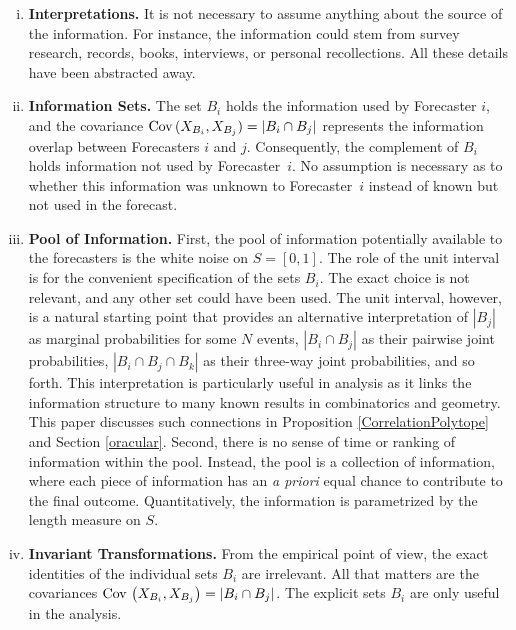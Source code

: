 \documentclass[12pt]{article}
\theoremstyle{definition}
\theoremstyle{definition}
\def\Cov{{\rm Cov}\,}
\begin{document}
\begin{enumerate}[(i)]
\item {\bf Interpretations.} It is not necessary to assume anything 
about the source of the information.  For instance, the information 
could stem from survey research, records, books, 
interviews, or personal recollections.  All these details have 
been abstracted away.

\item {\bf Information Sets.} The set $B_i$ holds the information used
by Forecaster $i$, and the covariance $\Cov (X_{B_i} , X_{B_j}) = |B_{i} \cap B_{j}|$
represents the information overlap between Forecasters $i$ and
$j$.
Consequently, the complement of $B_i$ holds information not used by
Forecaster~$i$.  No assumption is necessary as to whether this
information was unknown to Forecaster~$i$ instead of known but not
used in the forecast.


\item {\bf Pool of Information.} First, the pool of
information potentially available to the forecasters is the white
noise on $S = [0,1]$. The role of the unit interval
is for the convenient specification of the sets $B_i$.
The exact choice is not relevant, and
any other set could have been used. The unit interval, however, is a
natural starting point that provides an alternative interpretation of $|B_j|$ as marginal probabilities for some $N$ events, $|B_i \cap B_j|$ as their pairwise joint probabilities, $|B_i \cap B_j \cap B_k|$ as their three-way joint probabilities,
and so forth.  This interpretation is particularly useful in analysis as it links the
information structure to many known results in combinatorics and geometry. This paper discusses such connections in Proposition \ref{CorrelationPolytope} and Section \ref{oracular}. Second, there is
no sense of time or ranking of information within the
pool. Instead, the pool is a collection of information, where each
piece of information has an {\em a priori} equal chance to contribute
to the final outcome.  Quantitatively, the information is parametrized
by the length measure on $S$. \label{item:pool}


\item {\bf Invariant Transformations.}  From the empirical point of
view, the exact identities of the individual sets $B_i$ are
irrelevant.  All that matters are the covariances $\Cov \left(X_{B_i}
, X_{B_j}\right) = |B_i \cap B_j|$.  The explicit sets $B_i$ are only useful in the analysis.


\end{enumerate}
\end{document}
